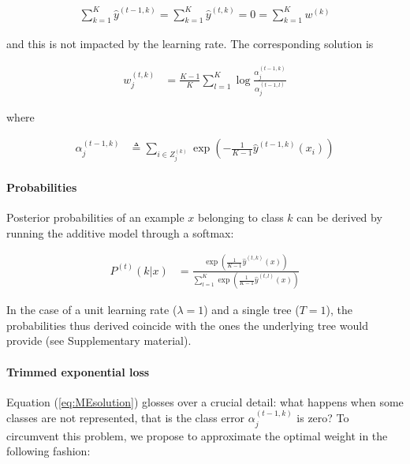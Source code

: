 \documentclass{article}
\begin{document}
\vspace*{-\baselineskip}
\begin{align}\label{eq:MEzeroSum}
\sum_{k=1}^{K} \hat{y}^{(t-1, k)} = \sum_{k=1}^{K} 
\hat{y}^{(t, k)} = 0 = \sum_{k=1}^{K} w^{(k)}
\end{align}
\vspace*{-\baselineskip}

and this is not impacted by the learning rate. The corresponding solution is

\vspace*{-\baselineskip}
\begin{align}\label{eq:MEsolution}
w_j^{(t,k)} &= \frac{K-1}{K}  \sum_{l=1}^{K} \log \frac{\alpha_j^{(t-1, 
k)}}{\alpha_j^{(t-1, l)}}
\end{align}
\vspace*{-\baselineskip}

where

\vspace*{-\baselineskip}
\begin{align}\label{eq:MEClsErrZS}
\alpha_j^{(t-1, k)} &\triangleq \sum_{i \in Z_j^{(k)}} \exp \left( 
-\frac{1}{K-1} \hat{y}^{(t-1, k)}(x_i) \right) 
\end{align}
\vspace*{-\baselineskip}

\paragraph{Probabilities}
Posterior probabilities of an example $x$ belonging to class $k$ can be derived 
by running the additive model through a softmax:

\vspace*{-\baselineskip}
\begin{align}\label{eq:MEproba}
P^{(t)}(k|x) &= \frac{\exp \left(\frac{1}{K-1} \hat{y}^{(t, k)}(x) 
\right)}{\sum_{l=1}^K\exp \left(\frac{1}{K-1} \hat{y}^{(t, l)}(x) \right)}
\end{align}
\vspace*{-\baselineskip}

In the case of a unit learning rate ($\lambda = 1$) and a single tree ($T=1$), 
the probabilities thus derived coincide with the ones the underlying tree would 
provide (see Supplementary material).


\paragraph{Trimmed exponential loss}
Equation (\ref{eq:MEsolution}) glosses over a crucial detail: what happens when 
some classes are not represented, that is the class error $\alpha_j^{(t-1, k)}$ 
is zero? To circumvent this problem, we propose to approximate the optimal 
weight in the following fashion:
\end{document}
